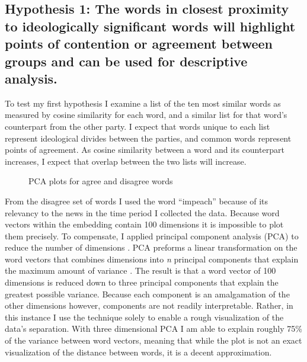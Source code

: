 \documentclass[../embeddings.tex]{subfiles}
\begin{document}
\subsection{Hypothesis 1: The words in closest proximity to ideologically significant words will highlight points of contention or agreement between groups and can be used for descriptive analysis.}

To test my first hypothesis I examine a list of the ten most similar words as measured by cosine similarity for each word, and a similar list for that word's counterpart from the other party. I expect that words unique to each list represent ideological divides between the parties, and common words represent points of agreement. As cosine similarity between a word and its counterpart increases, I expect that overlap between the two lists will increase. 

\begin{figure}[h]
  \centering
  \qquad
  \caption{PCA plots for agree and disagree words}
\end{figure}

From the disagree set of words I used the word ``impeach'' because of its relevancy to the news in the time period I collected the data. Because word vectors within the embedding contain 100 dimensions it is impossible to plot them precisely. To compensate, I applied principal component analysis (PCA) to reduce the number of dimensions \cite{scikit-learn}. PCA preforms a linear transformation on the word vectors that combines dimensions into \textit{n} principal components that explain the maximum amount of variance \cite{wold1987principal}. The result is that a word vector of 100 dimensions is reduced down to three principal components that explain the greatest possible variance. Because each component is an amalgamation of the other dimensions however, components are not readily interpretable. Rather, in this instance I use the technique solely to enable a rough visualization of the data's separation. With three dimensional PCA I am able to explain roughly 75\% of the variance between word vectors, meaning that while the plot is not an exact visualization of the distance between words, it is a decent approximation.
\end{document}
